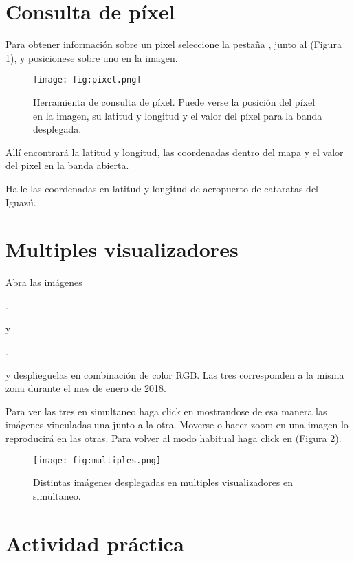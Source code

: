\section{Consulta de píxel}

Para obtener información sobre un pixel seleccione la pestaña , junto al  (Figura \ref{fig:pixel}), y posicionese  sobre uno en la imagen.

\begin{figure}[h!]
    \centering
    \texttt{[image: fig:pixel.png]}
    \caption{Herramienta de consulta de píxel. Puede verse la posición del píxel en la imagen, su latitud y longitud y el valor del píxel para la banda desplegada.}
    \label{fig:pixel}
\end{figure}

Allí encontrará la latitud y longitud, las coordenadas dentro del mapa y el valor del pixel en la banda abierta.

Halle las coordenadas en latitud y longitud de aeropuerto de cataratas del Iguazú.

\section{Multiples visualizadores}

Abra las imágenes
\begin{center} .
\end{center}
y
\begin{center} .
\end{center}

y desplieguelas en combinación de color RGB. Las tres corresponden a la misma zona durante el mes de enero de 2018.

Para ver las tres en simultaneo haga click en  mostrandose de esa manera las imágenes vinculadas una junto a la otra. Moverse o hacer zoom en una imagen lo reproducirá en las otras. Para volver al modo habitual haga click en  (Figura \ref{fig:multiples}).

\begin{figure}[h!]
    \centering
    \texttt{[image: fig:multiples.png]}
    \caption{Distintas imágenes desplegadas en multiples visualizadores en simultaneo.}
    \label{fig:multiples}
\end{figure}

\section{Actividad práctica}

